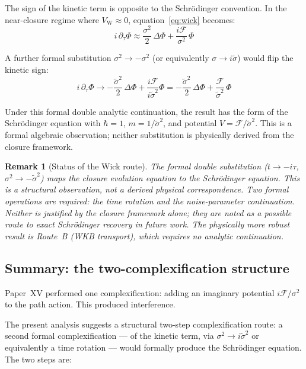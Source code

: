 \documentclass[12pt]{article}
\newtheorem{remark}[theorem]{Remark}
\newcommand{\Fcal}{\mathcal{F}}
\begin{document}
The sign of the kinetic term is opposite to the Schr\"odinger convention. In the near-closure regime where $V_{\mathrm{W}} \approx 0$, equation~\eqref{eq:wick} becomes:
\begin{equation}
    i\,\partial_\tau \Phi \approx \frac{\sigma^2}{2}\,\Delta\Phi + \frac{i\Fcal}{\sigma^2}\,\Phi
\end{equation}

A further formal substitution $\sigma^2 \to -\sigma^2$ (or equivalently $\sigma \to i\tilde{\sigma}$) would flip the kinetic sign:
\begin{equation}
    i\,\partial_\tau \Phi \to -\frac{\tilde{\sigma}^2}{2}\,\Delta\Phi + \frac{i\Fcal}{i\tilde{\sigma}^2}\Phi = -\frac{\tilde{\sigma}^2}{2}\,\Delta\Phi + \frac{\Fcal}{\tilde{\sigma}^2}\,\Phi
\end{equation}

Under this formal double analytic continuation, the result has the form of the Schr\"odinger equation with $\hbar = 1$, $m = 1/\tilde{\sigma}^2$, and potential $V = \Fcal/\tilde{\sigma}^2$. This is a formal algebraic observation; neither substitution is physically derived from the closure framework.

\begin{remark}[Status of the Wick route]
The formal double substitution ($t \to -i\tau$, $\sigma^2 \to -\tilde{\sigma}^2$) maps the closure evolution equation to the Schr\"odinger equation. This is a structural observation, not a derived physical correspondence. Two formal operations are required: the time rotation and the noise-parameter continuation. Neither is justified by the closure framework alone; they are noted as a possible route to exact Schr\"odinger recovery in future work. The physically more robust result is Route~B (WKB transport), which requires no analytic continuation.
\end{remark}

\subsection{Summary: the two-complexification structure}

Paper~XV performed one complexification: adding an imaginary potential $i\Fcal/\sigma^2$ to the path action. This produced interference.

The present analysis suggests a structural two-step complexification route: a second formal complexification --- of the kinetic term, via $\sigma^2 \to i\tilde{\sigma}^2$ or equivalently a time rotation --- would formally produce the Schr\"odinger equation. The two steps are:
\end{document}
